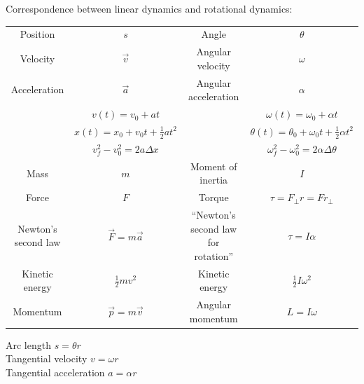 \documentclass[12pt]{article}
\begin{document}
\begin{enumerate}
\bigskip
\bigskip
\bigskip

Correspondence between linear dynamics and rotational dynamics: 
  \scriptsize

\begin{tabular}{| c | c | c | c |}
  \hline
  Position & $s$ & Angle & $\theta$  \\
  Velocity & $\vec v$ & Angular velocity & $\omega$  \\
  Acceleration & $\vec a$ & Angular acceleration & $\alpha$  \\
  \hline
                                   & $v(t) = v_0 + at$ & & $\omega(t) = \omega_0 + \alpha t$ \\
                                   & $x(t) = x_0 + v_0 t + \frac{1}{2} at^2$ & & $\theta(t) = \theta_0 + \omega_0 t + \frac{1}{2} \alpha t^2$ \\
                                   & $v_f^2 - v_0^2 = 2a \Delta x$ & & $\omega_f^2 - \omega_0^2 = 2 \alpha \Delta \theta$ \\
  \hline
  Mass & $m$ & Moment of inertia & $I$ \\
  \hline
  Force & $F$ & Torque & $\tau = F_\perp r = F r_\perp$ \\
  \hline
  Newton's second law & $\vec F = m \vec a$ & ``Newton's second law for rotation'' & $\tau = I \alpha$ \\
  \hline
  Kinetic energy & $\frac{1}{2} mv^2$ & Kinetic energy & $\frac{1}{2}I\omega^2$ \\
  \hline
  Momentum & $\vec p = m \vec v$ & Angular momentum & $L = I \omega$ \\
  \hline
\end{tabular}

\bigskip
\bigskip
\bigskip

Arc length $s=\theta r$ \\
Tangential velocity $v=\omega r$ \\
Tangential acceleration $a=\alpha r$




 \end{enumerate}
 
\end{document}

